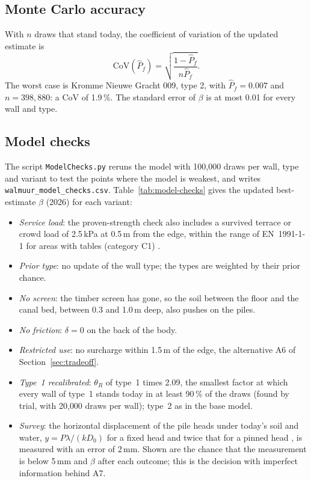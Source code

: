 \subsection{Monte Carlo accuracy}\label{app:prob-mc}

With $n$ draws that stand today, the coefficient of variation of the updated
estimate is
\begin{equation}
\text{CoV}(\hat P_f) = \sqrt{\frac{1 - \hat P_f}{n \hat P_f}}.
\end{equation}
The worst case is Kromme Nieuwe Gracht 009, type 2, with $\hat P_f = 0.007$
and $n = 398{,}880$: a CoV of 1.9\,\%. The standard error of $\beta$ is at most
0.01 for every wall and type.

\subsection{Model checks}\label{app:prob-checks}

The script \texttt{ModelChecks.py} reruns the model with 100{,}000 draws per wall,
type and variant to test the points where the model is weakest, and writes
\texttt{walmuur\_model\_checks.csv}. Table~\ref{tab:model-checks} gives the
updated best-estimate $\beta$ (2026) for each variant:
\begin{itemize}
  \item \emph{Service load}: the proven-strength check also includes a
    survived terrace or crowd load of 2.5\,kPa at 0.5\,m from the edge, within
    the range of EN~1991-1-1 for areas with tables (category C1)
    \parencite{en1991}.
  \item \emph{Prior type}: no update of the wall type; the types are weighted
    by their prior chance.
  \item \emph{No screen}: the timber screen has gone, so the soil between the
    floor and the canal bed, between 0.3 and 1.0\,m deep, also pushes on the
    piles.
  \item \emph{No friction}: $\delta = 0$ on the back of the body.
  \item \emph{Restricted use}: no surcharge within 1.5\,m of the edge, the
    alternative A6 of Section~\ref{sec:tradeoff}.
  \item \emph{Type~1 recalibrated}: $\theta_R$ of type~1 times 2.09, the
    smallest factor at which every wall of type~1 stands today in at least
    90\,\% of the draws (found by trial, with 20{,}000 draws per wall); type~2 as in
    the base model.
  \item \emph{Survey}: the horizontal displacement of the pile heads under
    today's soil and water, $y = P\lambda/(kD_0)$ for a fixed head and twice
    that for a pinned head \parencite{hetenyi1946}, is measured with an error
    of 2\,mm. Shown are
    the chance that the measurement is below 5\,mm and $\beta$ after each
    outcome; this is the decision with imperfect information behind A7.
\end{itemize}

